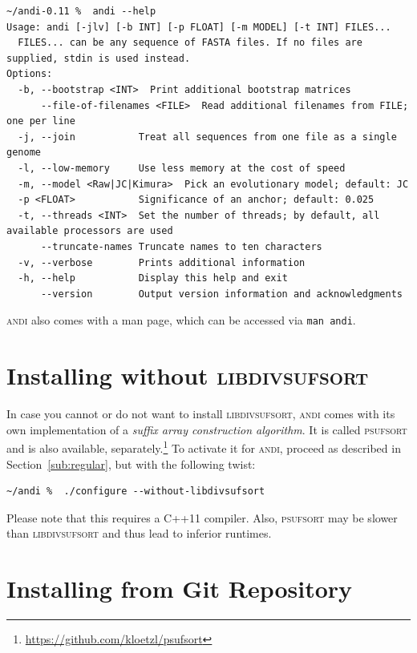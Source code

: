 \documentclass[a4paper,
  10pt,
  english,
  DIV=12,
  BCOR=8mm]{scrbook}
\newcommand{\algo}[1]{\textsc{{#1}}}
\newcommand{\andi}{\algo{andi}\xspace}
\begin{document}
\begin{lstlisting}
~/andi-0.11 %  andi --help
Usage: andi [-jlv] [-b INT] [-p FLOAT] [-m MODEL] [-t INT] FILES...
  FILES... can be any sequence of FASTA files. If no files are supplied, stdin is used instead.
Options:
  -b, --bootstrap <INT>  Print additional bootstrap matrices
      --file-of-filenames <FILE>  Read additional filenames from FILE; one per line
  -j, --join           Treat all sequences from one file as a single genome
  -l, --low-memory     Use less memory at the cost of speed
  -m, --model <Raw|JC|Kimura>  Pick an evolutionary model; default: JC
  -p <FLOAT>           Significance of an anchor; default: 0.025
  -t, --threads <INT>  Set the number of threads; by default, all available processors are used
      --truncate-names Truncate names to ten characters
  -v, --verbose        Prints additional information
  -h, --help           Display this help and exit
      --version        Output version information and acknowledgments
\end{lstlisting}

\noindent \andi also comes with a man page, which can be accessed via \lstinline$man andi$. %

\section{Installing without \algo{libdivsufsort}} \label{sub:wo-divsufsort}

In case you cannot or do not want to install \algo{libdivsufsort}, \andi comes with its own implementation of a \emph{suffix array construction algorithm}. It is called \algo{psufsort} and is also available, separately.\footnote{\url{https://github.com/kloetzl/psufsort}} To activate it for \algo{andi}, proceed as described in Section~\ref{sub:regular}, but with the following twist:

\begin{lstlisting}
~/andi %  ./configure --without-libdivsufsort
\end{lstlisting}

Please note that this requires a C++11 compiler. Also, \algo{psufsort} may be slower than \algo{libdivsufsort} and thus lead to inferior runtimes.

\section{Installing from Git Repository}
\end{document}
